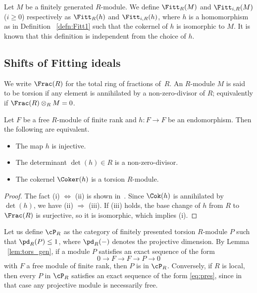 \begin{defi}\label{defn:Fitt2}
Let $M$ be a finitely generated $R$-module.
We define $\Fitt_R(M)$ and $\Fitt_{i, R}(M)$ ($i \geq 0$) respectively as $\Fitt_R(h)$ and $\Fitt_{i, R}(h)$, where $h$ is a homomorphism as in Definition ~\ref{defn:Fitt1} such that the cokernel of $h$ is isomorphic to $M$.
It is known that this definition is independent from the choice of $h$.
\end{defi}

\subsection{Shifts of Fitting ideals}\label{ss:shift_defn}

We write $\Frac(R)$ for the total ring of fractions of~$R$.
An $R$-module $M$ is said to be torsion if any element is annihilated by a non-zero-divisor of $R$; equivalently if $\Frac(R) \otimes_R M = 0$.

\begin{lemm}\label{lem:tors_gen}
Let $F$ be a free $R$-module of finite rank and $h: F \to F$ be an endomorphism.
Then the following are equivalent.
\begin{itemize}
\item[(i)]
The map $h$ is injective.
\item[(ii)]
The determinant $\det(h) \in R$ is a non-zero-divisor.
\item[(iii)]
The cokernel $\Coker(h)$ is a torsion $R$-module.
\end{itemize}
\end{lemm}

\begin{proof}
The fact (i) $\Leftrightarrow$ (ii) is shown in~\cite[Chapter III, \S 8, Proposition 3, p.~524]{BouAlg74}.
Since $\Cok(h)$ is annihilated by $\det(h)$, we have (ii) $\Rightarrow$ (iii).
If (iii) holds, the base change of $h$ from $R$ to $\Frac(R)$ is surjective, so it is isomorphic, which implies (i).
\end{proof}

Let us define $\cP_R$ as the category of finitely presented torsion $R$-module $P$ such that $\pd_R(P) \leq 1$, where $\pd_R(-)$ denotes the projective dimension.
By Lemma ~\ref{lem:tors_gen}, if a module $P$ satisfies an exact sequence of the form
\begin{equation}\label{eq:pres}
0 \to F \to F \to P \to 0
\end{equation}
with $F$ a free module of finite rank, then $P$ is in $\cP_R$.
Conversely, if $R$ is local, then every $P$ in $\cP_R$ satisfies an exact sequence of the form \eqref{eq:pres}, since in that case any projective module is necessarily free.

